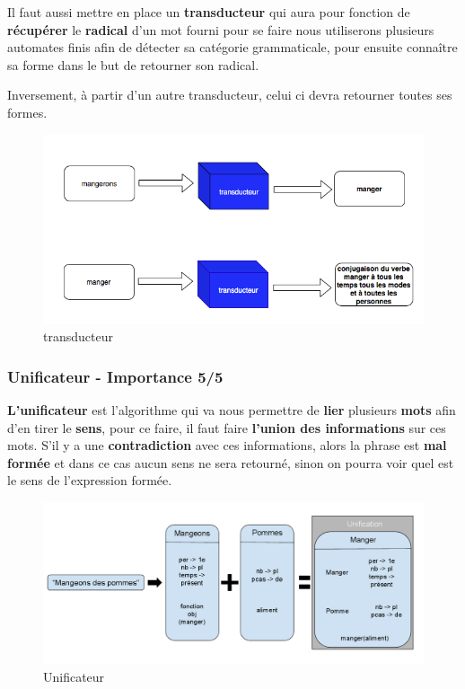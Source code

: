 {Il faut aussi mettre en place un \textbf{transducteur} qui aura pour fonction de \textbf{récupérer} le \textbf{radical} d'un mot fourni pour se faire nous utiliserons plusieurs automates finis afin de détecter sa catégorie grammaticale, pour ensuite connaître sa forme dans le but de retourner son radical.\par}

{Inversement, à partir d'un autre transducteur, celui ci devra retourner toutes ses formes.\par}

\begin{figure}[ht]
    \centering
    \includegraphics[scale=0.5]{transducteur.png}
    \caption{transducteur }
\end{figure}

\newpage

\subsubsection{Unificateur - Importance 5/5}{
\textbf{L'unificateur} est l'algorithme qui va nous permettre de \textbf{lier} plusieurs \textbf{mots} afin d'en tirer le \textbf{sens}, pour ce faire, il faut faire \textbf{l'union des informations} sur ces mots. S'il y a une \textbf{contradiction} avec ces informations, alors la phrase est \textbf{mal formée} et dans ce cas aucun sens ne sera retourné, sinon on pourra voir quel est le sens de l'expression formée.\par}

\begin{figure}[ht]
    \centering
    \includegraphics[scale=0.4]{unificateur.png}
    \caption{Unificateur }
\end{figure}

